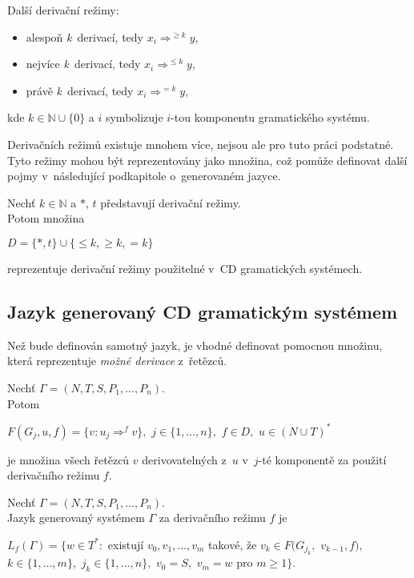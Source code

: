Další derivační režimy:
\begin{itemize}
    \item alespoň \emph{k}~derivací, tedy $x_i \Rightarrow^{\geq k} y$,
    \item nejvíce \emph{k}~derivací, tedy $x_i \Rightarrow^{\leq k} y$,
    \item právě \emph{k}~derivací, tedy $x_i \Rightarrow^{=k} y$,
\end{itemize}
kde $k \in \mathbb{N} \cup \{0\}$ a $i$ symbolizuje $i$-tou komponentu gramatického systému.

Derivačních režimů existuje mnohem více, nejsou ale pro tuto práci podstatné.
Tyto režimy mohou být reprezentovány jako množina, což pomůže definovat další pojmy v~následující podkapitole o~generovaném jazyce.
\begin{definition}\label{def_der_rezimy}
    Nechť $k\in \mathbb{N}$ a $*$, $t$ představují derivační režimy. \\
    Potom množina
    \begin{center}
        $D = \{*, t\} \cup \{\leq k, \geq k, =k\}$ 
    \end{center}        
    reprezentuje derivační režimy použitelné v~CD gramatických systémech.
\end{definition}

\subsection*{Jazyk generovaný CD gramatickým systémem}
Než bude definován samotný jazyk, je vhodné definovat pomocnou množinu, která reprezentuje \emph{možné derivace} z~řetězců.
\begin{definition}\label{def_mozne_derivace}
    Nechť $\Gamma = (N, T, S, P_1, \ldots, P_n)$. \\  
    Potom 
    \begin{center}
        $F(G_j,u,f)=\{v:u_j\Rightarrow^{f}v\},$ $j \in \{1, \ldots, n\},$ $f\in D,$ $u\in (N \cup T)^{*}$
    \end{center}        
    je množina všech řetězců $v$ derivovatelných z~$u$ v~$j$-té komponentě za použití derivačního režimu $f$.
\end{definition}

\begin{definition}\label{def_generovany_jazyk}
    Nechť $\Gamma = (N, T, S, P_1, \ldots, P_n)$. \\  
    Jazyk generovaný systémem $\Gamma$ za derivačního režimu $f$ je 
    \begin{center}
         $L_f(\Gamma) = \{ w \in T^*:$ existují $v_0, v_1,\ldots, v_m$ takové, že $v_k \in F(G_{j_{k}},$ $v_{k-1}, f),$\\$k \in \{1, \ldots, m\},$ $j_k \in \{1, \ldots, n\},$ $v_0 = S,$ $v_m = w$ pro $m \geq 1\}$.  
    \end{center}        
\end{definition} 

